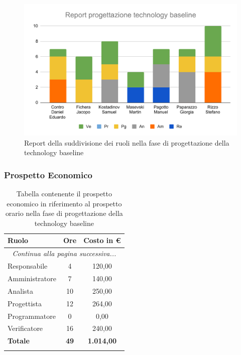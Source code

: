 \documentclass[../piano_di_progetto.tex]{subfiles}
\begin{document}
\begin{figure}[H]
	\centering
	\includegraphics[width=13cm]{src/img/report/report_technology_baseline.pdf}
	\caption{Report della suddivisione dei ruoli nella fase di progettazione della technology baseline}
\end{figure}

\subsubsection{Prospetto Economico}

\begin{center}
	\begin{longtable}{|l|c|c|}
		\hline
		\rowcolor{lightgray}
		\textbf{Ruolo} & \textbf{Ore} & \textbf{Costo in €}\\
		\hline
		\endhead
		
		\hline
		\multicolumn{3}{|c|}{\emph{Continua alla pagina successiva...}}\\
		\hline
		\endfoot

		\endlastfoot

		\hline
		Responsabile & 4 & 120,00\\
		Amministratore & 7 & 140,00\\
		Analista & 10 & 250,00\\
		Progettista & 12 & 264,00\\
		Programmatore & 0 & 0,00\\
		Verificatore & 16 & 240,00\\
		\hline
		\textbf{Totale} & \textbf{49} & \textbf{1.014,00}\\
		\hline
		\rowcolor{white}
		\caption{Tabella contenente il prospetto economico in riferimento al prospetto orario nella fase di progettazione della technology baseline}
	\end{longtable}
\end{center}
\end{document}
